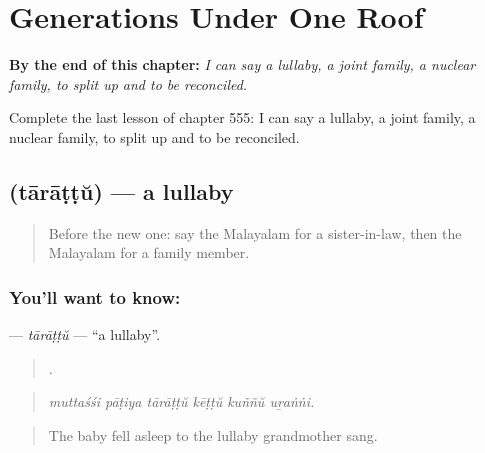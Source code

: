 
\chapter{Generations Under One Roof}
\label{ch:ml-generations-under-one-roof}

\begin{chapteropening}
\textbf{By the end of this chapter:} \emph{I can say a lullaby, a joint family, a nuclear family, to split up and to be reconciled.}

Complete the last lesson of chapter 555: I can say a lullaby, a joint family, a nuclear family, to split up and to be reconciled.
\end{chapteropening}

\section[\texorpdfstring{\ml{താരാട്ട്} (tārāṭṭŭ)}{താരാട്ട് (tārāṭṭŭ)}]{ (tārāṭṭŭ) — a lullaby}

\label{lesson:ML-C555-tarattu}



\begin{quote}
Before the new one: say the Malayalam for a sister-in-law, then the Malayalam for a family member.
\end{quote}

\subsection*{You'll want to know: }
\textbf{} — \emph{tārāṭṭŭ} — \textquotedblleft{}a lullaby\textquotedblright{}.

\begin{quote}
     .
\end{quote}

\begin{quote}
\emph{muttaśśi pāṭiya tārāṭṭŭ kēṭṭŭ kuññŭ uṟaṅṅi.}
\end{quote}

\begin{quote}
The baby fell asleep to the lullaby grandmother sang.
\end{quote}

